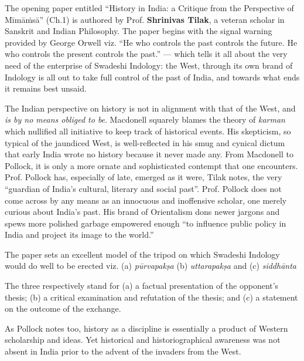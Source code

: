 The opening paper entitled “History in India: a Critique from the Perspective of Mīmāṁsā” (Ch.1) is authored by Prof. \textbf{Shrinivas Tilak}, a veteran scholar in Sanskrit and Indian Philosophy. The paper begins with the signal warning provided by George Orwell viz. “He who controls the past controls the future. He who controls the present controls the past.” — which tells it all about the very need of the enterprise of Swadeshi Indology: the West, through its own brand of Indology is all out to take full control of the past of India, and towards what ends it remains best unsaid. 

The Indian perspective on history is not in alignment with that of the West, and \textit{is by no means obliged to be}. Macdonell squarely blames the theory of \textit{karman} which nullified all initiative to keep track of historical events. His skepticism, so typical of the jaundiced West, is well-reflected in his smug and cynical dictum that early India wrote no history because it never made any. From Macdonell to Pollock, it is only a more ornate and sophisticated contempt that one encounters. Prof. Pollock has, especially of late, emerged as it were, Tilak notes, the very ``guardian of India’s cultural, literary and social past”. Prof. Pollock does not come across by any means as an innocuous and inoffensive scholar, one merely curious about India’s past. His brand of Orientalism dons newer jargons and spews more polished garbage empowered enough “to influence public policy in India and project its image to the world.”

The paper sets an excellent model of the tripod on which Swadeshi Indology would do well to be erected viz. (a) \textit{pūrvapakṣa} (b) \textit{uttarapakṣa} and (c) \textit{siddhānta}

The three respectively stand for (a) a factual presentation of the opponent’s thesis; (b) a critical examination and refutation of the thesis; and (c) a statement on the outcome of the exchange. 

As Pollock notes too, history as a discipline is essentially a product of Western scholarship and ideas. Yet historical and historiographical awareness was not absent in India prior to the advent of the invaders from the West.

\newpage

